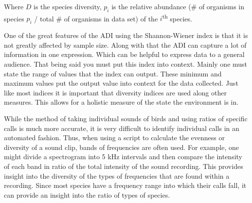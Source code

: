 Where $D$ is the species diversity, $p_i$ is the relative abundance (\# of organisms in species $p_i$ / total \# of organisms in data set) of the $i$\textsuperscript{th} species.\par
One of the great features of the ADI using the Shannon-Wiener index is that it is not greatly affected by sample size. Along with that the ADI can capture a lot of information in one expression. Which can be helpful to express data to a general audience. That being said you must put this index into context. Mainly one must state the range of values that the index can output. These minimum and maximum values put the output value into context for the data collected. Just like most indices it is important that diversity indices are used along other measures. This allows for a holistic measure of the state the environment is in.\cite{shannonWiener}\par
While the method of taking individual sounds of birds and using ratios of specific calls is much more accurate, it is very difficult to identify individual calls in an automated fashion. Thus, when using a script to calculate the evenness or diversity of a sound clip, bands of frequencies are often used. For example, one might divide a spectrogram into 5 kHz intervals and then compare the intensity of each band in ratio of the total intensity of the sound recording. This provides insight into the diversity of the types of frequencies that are found within a recording. Since most species have a frequency range into which their calls fall, it can provide an insight into the ratio of types of species.
